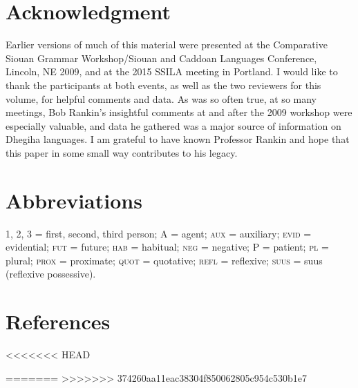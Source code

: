\documentclass[output=paper]{LSP/langsci}
\begin{document}
\section*{Acknowledgment}

Earlier versions of much of this material were presented at the Comparative Siouan Grammar Workshop/Siouan and Caddoan Languages Conference, Lincoln, NE 2009, and at the 2015 SSILA meeting in Portland. I would like to thank the participants at both events, as well as the two reviewers for this volume, for helpful comments and data. As was so often true, at so many meetings, Bob Rankin's insightful comments at and after the 2009 workshop were especially valuable, and data he gathered was a major source of information on Dhegiha languages. I am grateful to have known Professor Rankin and hope that this paper in some small way contributes to his legacy.

\section*{Abbreviations}

1, 2, 3 = first, second, third person; A = agent; \textsc{aux} = auxiliary; \textsc{evid} = evidential; \textsc{fut} = future; \textsc{hab} = habitual; \textsc{neg} = negative; P = patient; \textsc{pl} = plural; \textsc{prox} = proximate; \textsc{quot} = quotative; \textsc{refl} = reflexive; \textsc{suus} = suus (reflexive possessive). 

\section*{References}

<<<<<<< HEAD

\printbibliography[heading=subbibliography,notkeyword=this]
=======
\newenvironment{reflist} {\begin{list} {} {\listparindent -.25in
\leftmargin .3in} \item \ \vspace{-.3in} } {\end{list} }
>>>>>>> 374260aa11eac38304f850062805c954c530b1e7
\end{document}
